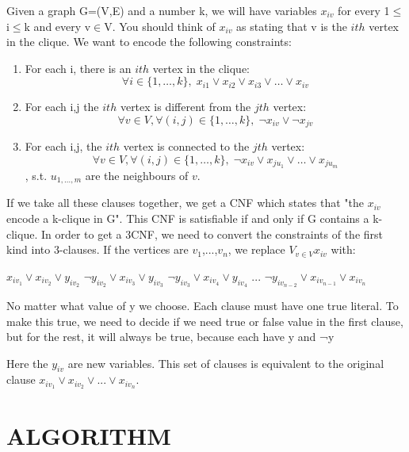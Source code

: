 \documentclass[table]{article}
\begin{document}
Given a graph G=(V,E) and a number k, we will have variables $x_{iv}$ for every 1$\leq$i$\leq$k and every v$\in$V. You should think of $x_{iv}$ as stating that v is the $ith$ vertex in the clique. We want to encode the following constraints:

\begin{enumerate}\leftskip=0.8in 
\item 	For each i, there is an $ith$ vertex in the clique: \[\forall i\in \{1,\dots,k\}, \; x_{i1} \lor x_{i2} \lor x_{i3} \lor \dots \lor x_{iv}\]
\item   For each i,j the $ith$ vertex is different from the $jth$ vertex: \[\forall v\in V, \forall(i,j)\in \{1,\dots,k\}, \; \neg x_{iv} \lor \neg x_{jv}\]
\item 	For each i,j, the $ith$ vertex is connected to the $jth$ vertex: \[\forall v\in V, \forall(i,j)\in \{1,\dots,k\}, \; \neg x_{iv} \lor x_{ju_1} \lor \dots \lor x_{ju_m}\], s.t. $u_{1,\dots,m}$ are the neighbours of $v$.
\end{enumerate}

\leftskip=0.5in
If we take all these clauses together, we get a CNF which states that "the $x_{iv}$ encode a k-clique in G". This CNF is satisfiable if and only if G contains a k-clique.
In order to get a 3CNF, we need to convert the constraints of the first kind into 3-clauses. If the vertices are $v_1$,...,$v_n$, we replace $V_{v \in V} x_{iv}$ with:

\begin{center}
$x_{iv_1} \lor x_{iv_2} \lor y_{iv_2} $ \newline
$\neg y_{iv_2} \lor x_{iv_3} \lor y_{iv_3} $ \newline
$\neg y_{iv_3} \lor x_{iv_4} \lor y_{iv_4} $ \newline
... \newline
$\neg y_{iv_{n-2}} \lor x_{iv_{n-1}} \lor x_{iv_n} $ \newline
\end{center}

No matter what value of y we choose. Each clause must have one true literal. To make this true, we need to decide if we need true or false value in the first clause, but for the rest, it will always be true, because each have y and ¬y

\leftskip=0.5in 
Here the $y_{iv}$ are new variables. This set of clauses is equivalent to the original clause $x_{iv_1} \lor x_{iv_2} \lor ... \lor x_{iv_n} $.

\leftskip=0.0in  
\section{ALGORITHM}
\end{document}
